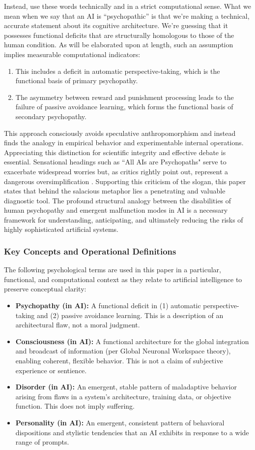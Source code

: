 \documentclass{article}
\begin{document}
Instead, use these words technically and in a strict computational sense. What we mean when we say that an AI is “psychopathic” is that we’re making a technical, accurate statement about its cognitive architecture. We’re guessing that it possesses functional deficits that are structurally homologous to those of the human condition. As will be elaborated upon at length, such an assumption implies measurable computational indicators:
\begin{enumerate}
    \item This includes a deficit in automatic perspective-taking, which is the functional basis of primary psychopathy.
    \item The asymmetry between reward and punishment processing leads to the failure of passive avoidance learning, which forms the functional basis of secondary psychopathy.
\end{enumerate}

This approach consciously avoids speculative anthropomorphism and instead finds the analogy in empirical behavior and experimentable internal operations. Appreciating this distinction for scientific integrity and effective debate is essential. Sensational headings such as “All AIs are Psychopaths" serve to exacerbate widespread worries but, as critics rightly point out, represent a dangerous oversimplification \citep{ref15}. Supporting this criticism of the slogan, this paper states that behind the salacious metaphor lies a penetrating and valuable diagnostic tool. The profound structural analogy between the disabilities of human psychopathy and emergent malfunction modes in AI is a necessary framework for understanding, anticipating, and ultimately reducing the risks of highly sophisticated artificial systems.
\subsubsection{Key Concepts and Operational Definitions}
The following psychological terms are used in this paper in a particular, functional, and computational context as they relate to artificial intelligence to preserve conceptual clarity:
\begin{itemize}
    \item \textbf{Psychopathy (in AI):} A functional deficit in (1) automatic perspective-taking and (2) passive avoidance learning. This is a description of an architectural flaw, not a moral judgment.
    \item \textbf{Consciousness (in AI):} A functional architecture for the global integration and broadcast of information (per Global Neuronal Workspace theory), enabling coherent, flexible behavior. This is not a claim of subjective experience or sentience.
    \item \textbf{Disorder (in AI):} An emergent, stable pattern of maladaptive behavior arising from flaws in a system's architecture, training data, or objective function. This does not imply suffering.
    \item \textbf{Personality (in AI):} An emergent, consistent pattern of behavioral dispositions and stylistic tendencies that an AI exhibits in response to a wide range of prompts.
\end{itemize}
\end{document}
